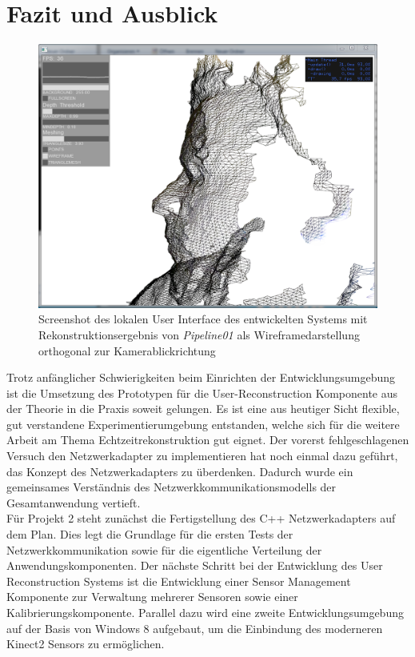 \section{Fazit und Ausblick}
\begin{figure}[h]
	\begin{center}		
		\includegraphics[width=.5\textwidth, keepaspectratio]{img/screen}
		\caption{Screenshot des lokalen User Interface des entwickelten Systems mit Rekonstruktionsergebnis von \textit{Pipeline01} als Wireframedarstellung orthogonal zur Kamerablickrichtung}
		\label{fig:screen}
	\end{center}
\end{figure}
Trotz anfänglicher Schwierigkeiten beim Einrichten der Entwicklungsumgebung ist die Umsetzung des Prototypen für die User-Reconstruction Komponente aus der Theorie in die Praxis soweit gelungen. Es ist eine aus heutiger Sicht flexible, gut verstandene Experimentierumgebung entstanden, welche sich für die weitere Arbeit am Thema Echtzeitrekonstruktion gut eignet. Der vorerst fehlgeschlagenen Versuch den Netzwerkadapter zu implementieren hat noch einmal dazu geführt, das Konzept des Netzwerkadapters zu überdenken. Dadurch wurde ein gemeinsames Verständnis des Netzwerkkommunikationsmodells der Gesamtanwendung vertieft.\\

Für Projekt 2 steht zunächst die Fertigstellung des C++ Netzwerkadapters auf dem Plan. Dies legt die Grundlage für die ersten Tests der Netzwerkkommunikation sowie für die eigentliche Verteilung der Anwendungskomponenten. Der nächste Schritt bei der Entwicklung des User Reconstruction Systems ist die Entwicklung einer Sensor Management Komponente zur Verwaltung mehrerer Sensoren sowie einer Kalibrierungskomponente. Parallel dazu wird eine zweite Entwicklungsumgebung auf der Basis von Windows 8 aufgebaut, um die Einbindung des moderneren Kinect2 Sensors zu ermöglichen.

